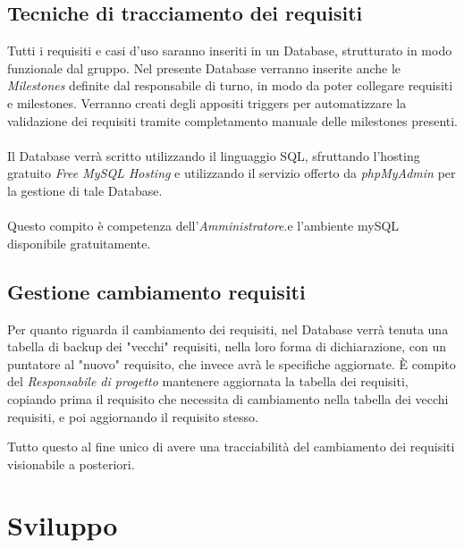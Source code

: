 \documentclass[a4paper]{report}
\begin{document}
	\subsection{Tecniche di tracciamento dei requisiti}
		Tutti i requisiti e casi d'uso saranno inseriti in un Database, strutturato in modo funzionale
		 dal gruppo. Nel presente Database verranno 	inserite anche le \emph{Milestones} definite 
		 dal responsabile di turno, in modo da poter collegare requisiti e milestones. Verranno 
		 creati degli appositi triggers per automatizzare la validazione dei requisiti tramite
		  completamento manuale delle	milestones presenti. 
		\\ \\ 
		Il Database verrà scritto utilizzando il linguaggio SQL, sfruttando l'hosting gratuito
		\emph{Free MySQL Hosting} e utilizzando il servizio offerto da \emph{phpMyAdmin} per
		la gestione di tale Database.
		\\ \\
		Questo compito è competenza dell'\emph{Amministratore}.e l'ambiente mySQL disponibile gratuitamente. 
	\subsection{Gestione cambiamento requisiti}
	Per quanto riguarda il cambiamento dei requisiti, nel Database verrà tenuta una tabella di backup dei "vecchi" requisiti, 
	nella loro forma di dichiarazione, con un puntatore al "nuovo" requisito, che invece avrà le specifiche aggiornate. È compito del
	\emph{Responsabile di progetto} mantenere aggiornata la tabella dei requisiti, copiando prima il requisito che necessita di cambiamento
	nella tabella dei vecchi requisiti, e poi aggiornando il requisito stesso.
	
	Tutto questo al fine unico di avere una tracciabilità del cambiamento dei requisiti visionabile a posteriori.
	\section{Sviluppo}
\end{document}
